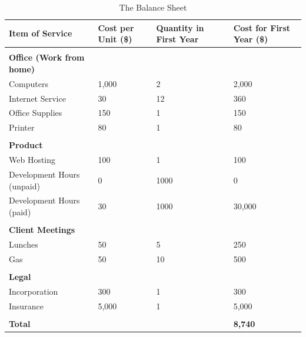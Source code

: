 \begin{table}[ht]
\caption{The Balance Sheet} %
\centering %
\begin{tabular}{| l | p{1in} | p{1in} | p{1in} |} %
\hline
{\bf Item of Service} & {\bf Cost per Unit  (\$)} &  {\bf Quantity in First Year } &  {\bf Cost for First Year (\$) } \\
\hline
 &   &   &   \\
{\bf Office (Work from home)} & & & \\
	Computers & 1,000 & 2 & 2,000 \\
	Internet Service & 30 & 12 & 360 \\
	Office Supplies & 150 & 1 & 150 \\
	Printer & 80 & 1 & 80 \\
 &   &   &   \\
{\bf Product} &   &   &   \\
	Web Hosting & 100 & 1 & 100 \\
	Development Hours (unpaid) & 0 & 1000 & 0 \\
	Development Hours (paid) & 30 & 1000 & 30,000 \\
  &   &   &   \\
{\bf Client Meetings} &   &   &   \\
	Lunches & 50 &  5 & 250\\
	Gas & 50 & 10 & 500 \\
  &   &   &   \\
{\bf Legal} &   &   &   \\
	Incorporation & 300 &  1 & 300\\
	Insurance & 5,000 & 1 & 5,000 \\
 &   &  &   \\ 
{\bf Total} &   &   & {\bf 8,740} \\

\hline
\end{tabular}
\label{balanceSheet} %
\end{table}
